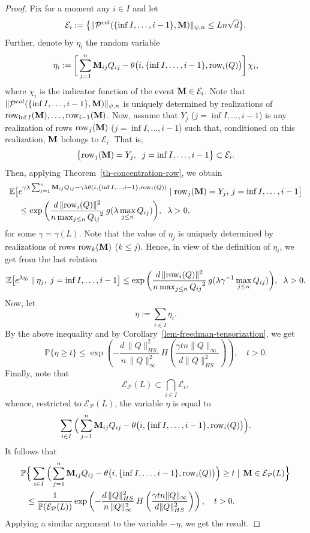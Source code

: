 \documentclass[12pt]{article}
\theoremstyle{definition}
\theoremstyle{plain}
\newcommand{\E}{\mathbb{E}}
\newcommand{\Event}{\mathcal{E}}
\def\ranmtx{{\bf{}M}}
\def\Prob{{\mathbb P}}
\def\Row{{\rm row}}
\def\pvector{{\mathcal P}}
\def\gfunction{{g}}
\begin{document}
\begin{proof}
Fix for a moment any $i\in I$ and let
$$\Event_i:=\big\{\|\pvector^{col}(\{\inf I,\dots, i-1\},\ranmtx)\|_{\psi,n}\leq   L  n\sqrt{d}\big\}.$$
Further, denote by
$\eta_i$ the random variable
$$\eta_i:=\bigg[\sum_{j=1}^n{\ranmtx}_{ij}Q_{ij}-\theta\big(i,\{\inf I,\dots, i-1\},\Row_i(Q)\big)\bigg]\,
\chi_{i},$$
where $\chi_{i}$ is the indicator function of the event $\ranmtx \in\Event_i$.
Note that $\|\pvector^{col}(\{\inf I,\dots, i-1\},\ranmtx)\|_{\psi,n}$ is uniquely determined by
realizations of $\Row_{\inf I}(\ranmtx),\dots,\Row_{i-1}(\ranmtx)$.
Now, assume that $Y_j$ ($j=\inf I,\dots,i-1$) is any realization of rows $\Row_j(\ranmtx)$ 
($j=\inf I,\dots,i-1$) such that, conditioned on this realization, $\ranmtx$ belongs to $\Event_i$. That is,
$$\big\{\Row_j(\ranmtx)=Y_j,\;\;j=\inf I,\dots,i-1\big\}\subset \Event_i.$$
Then, applying Theorem~\ref{th-concentration-row}, we obtain
\begin{align*}
\E\big[&e^{\gamma\lambda\sum_{j=1}^n{\ranmtx}_{ij}Q_{ij}-\gamma\lambda\theta(i,\{\inf I,\dots, i-1\},\Row_i(Q))}\mid
\Row_j(\ranmtx)=Y_j,\,j=\inf I,\dots,i-1\big]\\
&\leq \exp\bigg(\frac{d\,\|\Row_i(Q)\|^2}{n\max_{j\leq n}{Q_{ij}}^2}\,\gfunction(\lambda \max_{j\leq n}{Q_{ij}})\bigg),
\;\;\lambda>0,
\end{align*}
for some $\gamma=\gamma(L)$.
Note that the value of $\eta_j$ is uniquely determined by realizations of rows $\Row_k(\ranmtx)$ ($k\leq j$).
Hence, in view of the definition of $\eta_i$, we get from the last relation
$$\E\big[e^{\lambda\eta_i}\mid
\eta_j,\;j=\inf I,\dots,i-1\big]
\leq \exp\bigg(\frac{d\,\|\Row_i(Q)\|^2}{n\max_{j\leq n}{Q_{ij}}^2}\,\gfunction(\lambda \gamma^{-1}\max_{j\leq n}{Q_{ij}})\bigg),
\;\;\lambda>0.$$
Now, let
$$\eta:=\sum_{i\in I}\eta_i.$$
By the above inequality and by Corollary~\ref{lem-freedman-tensorization}, we get
$$\Prob\big\{\eta\geq t\big\}\leq
\exp\left(-\frac{d\,\|Q\|_{HS}^2}{n\,\|Q\|_\infty^2}\, H\left(\frac{\gamma tn\|Q\|_\infty}{d\|Q\|_{HS}^2}\right)\right),\quad t>0.$$
Finally, note that
$$\Event_\pvector(L)\subset\bigcap_{i\in I}\Event_i,$$
whence, restricted to $\Event_\pvector(L)$, the variable $\eta$ is equal to
$$\sum_{i\in I}\Big(\sum_{j=1}^n{\ranmtx}_{ij}Q_{ij}-\theta\big(i,\{\inf I,\dots, i-1\},\Row_i(Q)\big)\Big).$$
It follows that
\begin{align*}
\Prob&\Big\{\sum_{i\in I}\Big(\sum_{j=1}^n{\ranmtx}_{ij}Q_{ij}-\theta\big(i,\{\inf I,\dots, i-1\},\Row_i(Q)\big)\Big)\geq t
\mid\, \ranmtx\in\Event_\pvector(L)\Big\}\\
&\leq\frac{1}{\Prob(\Event_\pvector(L))}
\exp\left(-\frac{d\,\|Q\|_{HS}^2}{n\,\|Q\|_\infty^2}\, H\left(\frac{\gamma tn\|Q\|_\infty}{d\|Q\|_{HS}^2}\right)\right),\quad t>0.
\end{align*}
Applying a similar argument to the variable $-\eta$, we get the result.
\end{proof}
\end{document}
